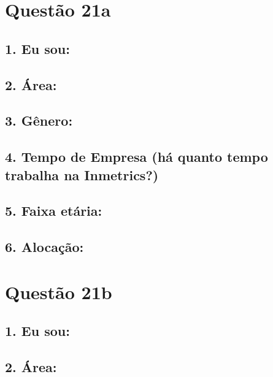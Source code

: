 \documentclass[]{book}
\begin{document}
\hypertarget{questao-21a}{%
\section{Questão 21a}\label{questao-21a}}

\hypertarget{eu-sou-61}{%
\subsection{1. Eu sou:}\label{eu-sou-61}}

\hypertarget{area-61}{%
\subsection{2. Área:}\label{area-61}}

\hypertarget{genero-61}{%
\subsection{3. Gênero:}\label{genero-61}}

\hypertarget{tempo-de-empresa-ha-quanto-tempo-trabalha-na-inmetrics-61}{%
\subsection{4. Tempo de Empresa (há quanto tempo trabalha na Inmetrics?)}\label{tempo-de-empresa-ha-quanto-tempo-trabalha-na-inmetrics-61}}

\hypertarget{faixa-etaria-61}{%
\subsection{5. Faixa etária:}\label{faixa-etaria-61}}

\hypertarget{alocacao-61}{%
\subsection{6. Alocação:}\label{alocacao-61}}

\hypertarget{questao-21b}{%
\section{Questão 21b}\label{questao-21b}}

\hypertarget{eu-sou-62}{%
\subsection{1. Eu sou:}\label{eu-sou-62}}

\hypertarget{area-62}{%
\subsection{2. Área:}\label{area-62}}
\end{document}
